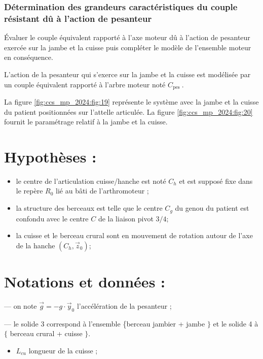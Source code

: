 \subsubsection{Détermination des grandeurs caractéristiques du couple résistant dû à l'action de pesanteur}
\begin{obj}
Évaluer le couple équivalent rapporté à l'axe moteur dû à l'action de pesanteur exercée sur la jambe et la cuisse puis compléter le modèle de l'ensemble moteur en conséquence.
\end{obj}
L'action de la pesanteur qui s'exerce sur la jambe et la cuisse est modélisée par un couple équivalent rapporté à l'arbre moteur noté $C_{\text {pes }}$.

La figure \ref{fig:ccs_mp_2024:fig:19} représente le système avec la jambe et la cuisse du patient positionnées sur l'attelle articulée. La figure \ref{fig:ccs_mp_2024:fig:20} fournit le paramétrage relatif à la jambe et la cuisse.

\section*{Hypothèses :}
\begin{itemize}
  \item le centre de l'articulation cuisse/hanche est noté $C_{h}$ et est supposé fixe dans le repère $R_{0}$ lié au bâti de l'arthromoteur ;

  \item la structure des berceaux est telle que le centre $C_{g}$ du genou du patient est confondu avec le centre $C$ de la liaison pivot $3 / 4$;

  \item la cuisse et le berceau crural sont en mouvement de rotation autour de l'axe de la hanche $\left(C_{h}, \vec{z}_{0}\right)$;

\end{itemize}

\section*{Notations et données :}
— on note $\vec{g}=-g \cdot \vec{y}_{0}$ l'accélération de la pesanteur ;

— le solide 3 correspond à l'ensemble \{berceau jambier + jambe $\}$ et le solide 4 à $\{$ berceau crural + cuisse $\}$.

\begin{itemize}
  \item $L_{c u}$ longueur de la cuisse ;
\end{itemize}

